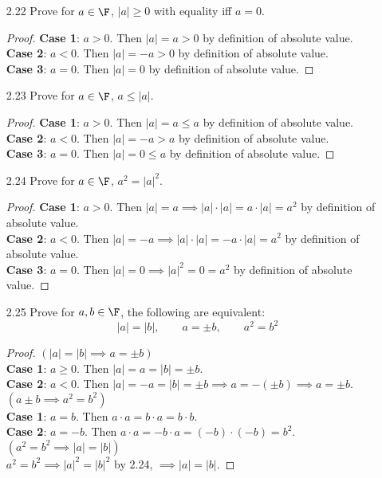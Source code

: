 \documentclass[12pt]{article}
\begin{document}
\begin{enumerate}
\begin{proof}
		\end{proof}
		\item[2.22] Prove for $a\in\F$, $|a|\geq 0$ with equality iff $a=0$.
		\begin{proof}
			\textbf{Case 1}: $a>0$. Then $|a| = a > 0 $ by definition of absolute value.\\
			\textbf{Case 2}: $a<0$. Then $|a| = -a > 0 $ by definition of absolute value.\\
			\textbf{Case 3}: $a=0$. Then $|a| = 0$ by definition of absolute value.
		\end{proof}
		\item[2.23] Prove for $a\in\F$, $a\leq|a|$.
		\begin{proof}
			\textbf{Case 1}: $a>0$. Then $|a| = a \leq a $ by definition of absolute value.\\
			\textbf{Case 2}: $a<0$. Then $|a| = -a > a $ by definition of absolute value.\\
			\textbf{Case 3}: $a=0$. Then $|a| = 0 \leq a$ by definition of absolute value.
		\end{proof}
		\item[2.24] Prove for $a\in\F$, $a^2 = |a|^2$.
		\begin{proof}
			\textbf{Case 1}: $a>0$. Then $|a| = a \implies |a|\cdot|a| = a\cdot|a| = a^2 $ by definition of absolute value.\\
			\textbf{Case 2}: $a<0$. Then $|a| = -a \implies |a|\cdot|a| = -a\cdot|a| = a^2 $ by definition of absolute value.\\
			\textbf{Case 3}: $a=0$. Then $|a| = 0 \implies |a|^2 = 0 = a^2$ by definition of absolute value.
		\end{proof}
		\item[2.25] Prove for $a,b\in\F$, the following are equivalent:
		\[|a|=|b|,\qquad a = \pm b,\qquad a^2=b^2\]
		\begin{proof}
			$(|a|=|b| \implies a=\pm b)$\\
			\textbf{Case 1}: $a \geq 0$. Then $|a| = a = |b| = \pm b$.\\
			\textbf{Case 2}: $a < 0$. Then $|a| = -a = |b| = \pm b \implies a = -(\pm b) \implies a = \pm b$.\\
			$(a\pm b \implies a^2 = b^2)$\\
			\textbf{Case 1}: $a = b$. Then $a\cdot a = b\cdot a = b\cdot b$.\\
			\textbf{Case 2}: $a = -b$. Then $a\cdot a = -b\cdot a = (-b)\cdot (-b) = b^2$.\\
			$(a^2 = b^2 \implies |a| = |b|)$\\
			$a^2 = b^2 \implies |a|^2 = |b|^2$ by 2.24, $\implies |a|=|b|$.
		\end{proof}
	\end{enumerate}
\end{document}
